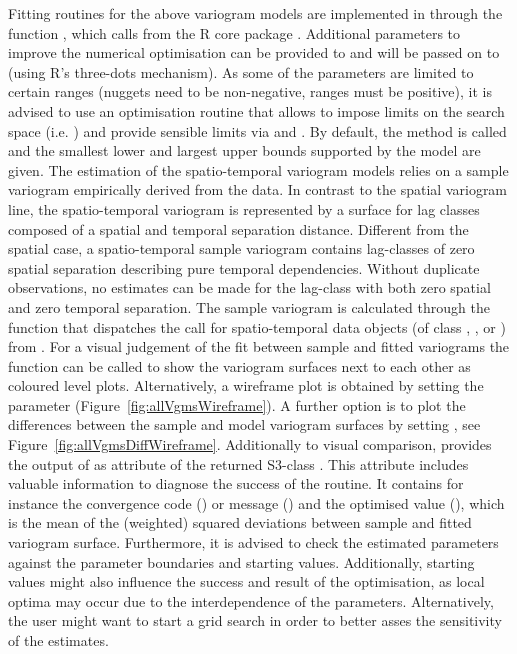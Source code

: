 Fitting routines for the above variogram models are implemented in  through the function , which calls  from the R core package  \citep{RCoreTeam2016}. Additional parameters to improve the numerical optimisation can be provided to  and will be passed on to  (using R's three-dots mechanism). As some of the parameters are limited to certain ranges (nuggets need to be non-negative, ranges must be positive), it is advised to use an optimisation routine that allows to impose limits on the search space (i.e. ) and provide sensible limits via  and . By default, the method  is called and the smallest lower and largest upper bounds supported by the model are given. The estimation of the spatio-temporal variogram models relies on a sample variogram empirically derived from the data. In contrast to the spatial variogram line, the spatio-temporal variogram is represented by a surface for lag classes composed of a spatial and temporal separation distance. Different from the spatial case, a spatio-temporal sample variogram contains lag-classes of zero spatial separation describing pure temporal dependencies. Without duplicate observations, no estimates can be made for the lag-class with both zero spatial and zero temporal separation. The sample variogram is calculated through the function  that dispatches the call for spatio-temporal data objects (of class , , or ) from . For a visual judgement of the fit between sample and fitted variograms the  function can be called to show the variogram surfaces next to each other as coloured level plots. Alternatively, a wireframe plot is obtained by setting the parameter   (Figure~\ref{fig:allVgmsWireframe}). A further option is to plot the differences between the sample and model variogram surfaces by setting , see Figure~\ref{fig:allVgmsDiffWireframe}. Additionally to visual comparison,  provides the output of  as attribute  of the returned S3-class . This attribute includes valuable information to diagnose the success of the  routine. It contains for instance the convergence code () or message () and  the optimised value (), which is the mean of the (weighted) squared deviations between sample and fitted variogram surface. Furthermore, it is advised to check the estimated parameters against the parameter boundaries and starting values. Additionally, starting values might also influence the success and result of the optimisation, as local optima may occur due to the interdependence of the parameters. Alternatively, the user might want to start a grid search in order to better asses the sensitivity of the estimates.

